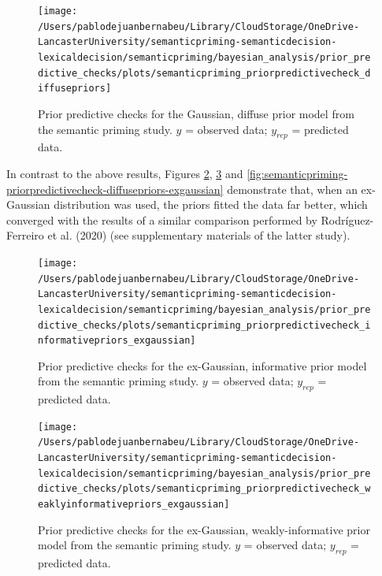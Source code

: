 \documentclass[
  12pt,
  man,floatsintext]{apa7}
\begin{document}
\begin{figure}

{\centering \texttt{[image: /Users/pablodejuanbernabeu/Library/CloudStorage/OneDrive-LancasterUniversity/semanticpriming-semanticdecision-lexicaldecision/semanticpriming/bayesian\_analysis/prior\_predictive\_checks/plots/semanticpriming\_priorpredictivecheck\_diffusepriors]} 

}

\caption{Prior predictive checks for the Gaussian, diffuse prior model from the semantic priming study. \(y\) = observed data; \(y_{rep}\) = predicted data.}\label{fig:semanticpriming-priorpredictivecheck-diffusepriors}
\end{figure}

In contrast to the above results, Figures \ref{fig:semanticpriming-priorpredictivecheck-informativepriors-exgaussian}, \ref{fig:semanticpriming-priorpredictivecheck-weaklyinformativepriors-exgaussian} and \ref{fig:semanticpriming-priorpredictivecheck-diffusepriors-exgaussian} demonstrate that, when an ex-Gaussian distribution was used, the priors fitted the data far better, which converged with the results of a similar comparison performed by Rodríguez-Ferreiro et al. (2020) (see supplementary materials of the latter study).



\begin{figure}

{\centering \texttt{[image: /Users/pablodejuanbernabeu/Library/CloudStorage/OneDrive-LancasterUniversity/semanticpriming-semanticdecision-lexicaldecision/semanticpriming/bayesian\_analysis/prior\_predictive\_checks/plots/semanticpriming\_priorpredictivecheck\_informativepriors\_exgaussian]} 

}

\caption{Prior predictive checks for the ex-Gaussian, informative prior model from the semantic priming study. \(y\) = observed data; \(y_{rep}\) = predicted data.}\label{fig:semanticpriming-priorpredictivecheck-informativepriors-exgaussian}
\end{figure}



\begin{figure}

{\centering \texttt{[image: /Users/pablodejuanbernabeu/Library/CloudStorage/OneDrive-LancasterUniversity/semanticpriming-semanticdecision-lexicaldecision/semanticpriming/bayesian\_analysis/prior\_predictive\_checks/plots/semanticpriming\_priorpredictivecheck\_weaklyinformativepriors\_exgaussian]} 

}

\caption{Prior predictive checks for the ex-Gaussian, weakly-informative prior model from the semantic priming study. \(y\) = observed data; \(y_{rep}\) = predicted data.}\label{fig:semanticpriming-priorpredictivecheck-weaklyinformativepriors-exgaussian}
\end{figure}
\end{document}
